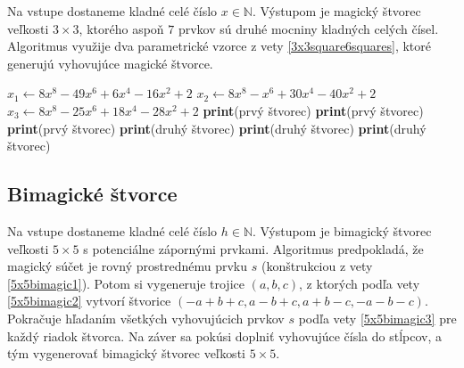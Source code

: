 \begin{alg}
\label{algsquare3x3x}
Na vstupe dostaneme kladné celé číslo $x \in \mathbb{N}$. Výstupom je magický štvorec veľkosti $3 \times 3$, ktorého aspoň $7$ prvkov sú druhé mocniny kladných celých čísel. Algoritmus využije dva parametrické vzorce z vety \ref{3x3square6squares}, ktoré generujú vyhovujúce magické štvorce.
\end{alg}

\begin{algorithmic}
\STATE $x_1 \gets 8x^8 - 49x^6 + 6x^4 - 16x^2 + 2$
\STATE $x_2 \gets 8x^8 - x^6 + 30x^4 - 40x^2 + 2$
\STATE $x_3 \gets 8x^8 - 25x^6 + 18x^4 - 28x^2 + 2$
    \STATE \textbf{print}(prvý štvorec)
\ENDIF
{}
    \STATE \textbf{print}(prvý štvorec)
\ENDIF
{}
    \STATE \textbf{print}(prvý štvorec)
\ENDIF
{}
    \STATE \textbf{print}(druhý štvorec)
\ENDIF
{}
    \STATE \textbf{print}(druhý štvorec)
\ENDIF
{}
    \STATE \textbf{print}(druhý štvorec)
\ENDIF
\end{algorithmic}

\subsection{Bimagické štvorce}

\begin{alg}
\label{algsquare5x5b}
Na vstupe dostaneme kladné celé číslo $h \in \mathbb{N}$. Výstupom je bimagický štvorec veľkosti $5 \times 5$ s potenciálne zápornými prvkami. Algoritmus predpokladá, že magický súčet je rovný prostrednému prvku $s$ (konštrukciou z vety \ref{5x5bimagic1}). Potom si vygeneruje trojice $(a,b,c)$, z ktorých podľa vety \ref{5x5bimagic2} vytvorí štvorice $(-a+b+c,a-b+c,a+b-c,-a-b-c)$. Pokračuje hľadaním všetkých vyhovujúcich prvkov $s$ podľa vety \ref{5x5bimagic3} pre každý riadok štvorca. Na záver sa pokúsi doplniť vyhovujúce čísla do stĺpcov, a tým vygenerovať bimagický štvorec veľkosti $5 \times 5$.
\end{alg}

